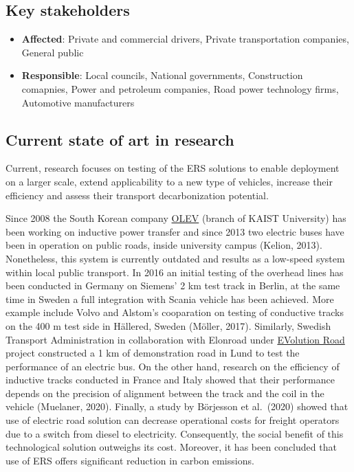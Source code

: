 \documentclass[
]{book}
\providecommand{\tightlist}{%
  \setlength{\itemsep}{0pt}\setlength{\parskip}{0pt}}
\begin{document}
\hypertarget{key-stakeholders-2}{%
\subsection*{Key stakeholders}\label{key-stakeholders-2}}

\begin{itemize}
\tightlist
\item
  \textbf{Affected}: Private and commercial drivers, Private transportation companies, General public
\item
  \textbf{Responsible}: Local councils, National governments, Construction comapnies, Power and petroleum companies, Road power technology firms, Automotive manufacturers
\end{itemize}

\hypertarget{current-state-of-art-in-research-2}{%
\subsection*{Current state of art in research}\label{current-state-of-art-in-research-2}}

Current, research focuses on testing of the ERS solutions to enable deployment on a larger scale, extend applicability to a new type of vehicles, increase their efficiency and assess their transport decarbonization potential.

Since 2008 the South Korean company \href{https://www.kaist.ac.kr/en/html/kaist/01200103.html}{OLEV} (branch of KAIST University) has been working on inductive power transfer and since 2013 two electric buses have been in operation on public roads, inside university campus (Kelion, 2013). Nonetheless, this system is currently outdated and results as a low-speed system within local public transport. In 2016 an initial testing of the overhead lines has been conducted in Germany on Siemens' 2 km test track in Berlin, at the same time in Sweden a full integration with Scania vehicle has been achieved. More example include Volvo and Alstom's cooparation on testing of conductive tracks on the 400 m test side in Hällered, Sweden (Möller, 2017). Similarly, Swedish Transport Administration in collaboration with Elonroad under \href{https://www.evolutionroad.se/en/}{EVolution Road} project constructed a 1 km of demonstration road in Lund to test the performance of an electric bus.
On the other hand, research on the efficiency of inductive tracks conducted in France and Italy showed that their performance depends on the precision of alignment between the track and the coil in the vehicle (Muelaner, 2020). Finally, a study by Börjesson et al.~(2020) showed that use of electric road solution can decrease operational costs for freight operators due to a switch from diesel to electricity. Consequently, the social benefit of this technological solution outweighs its cost. Moreover, it has been concluded that use of ERS offers significant reduction in carbon emissions.
\end{document}
